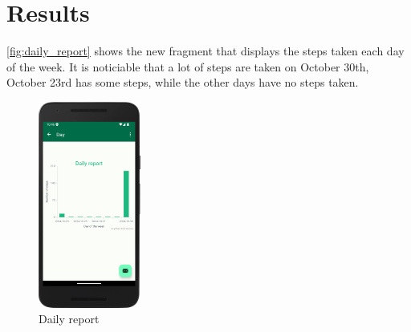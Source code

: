 \documentclass{usireport}
\begin{document}
\section{Results}
\autoref{fig:daily_report} shows the new fragment that displays the steps taken each day of the week. It is noticiable that a lot of steps are taken on October 30th, October 23rd has some steps, while the other days have no steps taken. 

\begin{figure}[H]
    \centering
    \includegraphics[width=0.3\textwidth]{fig/daily_report.png}
    \caption{Daily report}
    \label{fig:daily_report}
\end{figure}
\end{document}
